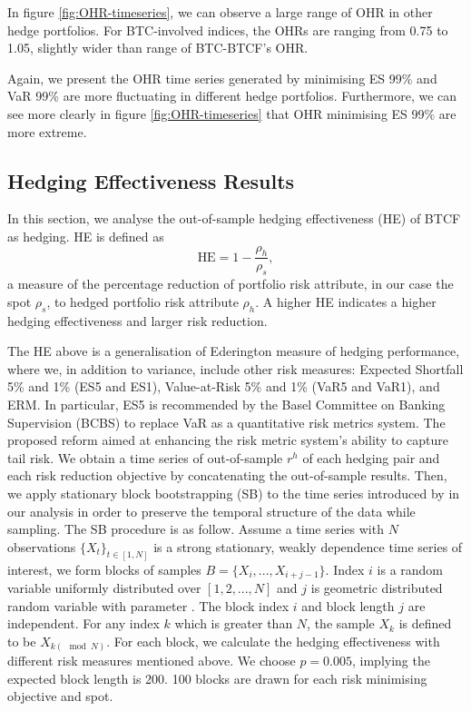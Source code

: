 In figure \ref{fig:OHR-timeseries}, we can observe a large range of OHR in other hedge portfolios.
For BTC-involved indices, the OHRs are ranging from 0.75 to 1.05, slightly wider than range of BTC-BTCF's OHR. \medskip

Again, we present the OHR time series generated by minimising ES 99\% and VaR 99\% are more fluctuating in different hedge portfolios.
Furthermore, we can see more clearly in figure \ref{fig:OHR-timeseries} that OHR minimising ES 99\% are more extreme. \medskip

\subsection{Hedging Effectiveness Results}\label{sec: HE results}
In this section, we analyse the out-of-sample hedging effectiveness (HE) of BTCF as hedging.
HE is defined as $$\text{HE} = 1-\frac{\rho_h}{\rho_s},$$
a measure of the percentage reduction of portfolio risk attribute, in our case the spot $\rho_s$,
to hedged portfolio risk attribute $\rho_h$.
A higher HE indicates a higher hedging effectiveness and larger risk reduction. \medskip

The HE above is a generalisation of Ederington measure of hedging performance, where we,
in addition to variance, include other risk measures: Expected Shortfall 5\% and 1\% (ES5 and ES1), Value-at-Risk 5\% and 1\% (VaR5 and VaR1), and ERM.
In particular, ES5 is recommended by the Basel Committee on Banking Supervision (BCBS) to replace VaR as a quantitative risk metrics system.
The proposed reform aimed at enhancing the risk metric system's ability to capture tail risk. \medskip
%
We obtain a time series of out-of-sample $r^h$ of each hedging pair and each risk reduction objective by concatenating the out-of-sample results.
Then, we apply stationary block bootstrapping (SB) to the time series introduced by \cite{Politis1994} in our analysis in order to preserve the temporal structure of the data while sampling.
The SB procedure is as follow.
Assume a time series with $N$ observations $\{X_t\}_{t \in [1,N]}$ is a strong stationary, weakly dependence time series of interest,
we form blocks of samples $B = \{X_i, ..., X_{i+j-1}\}$.
Index $i$ is a random variable uniformly distributed over $[1,2,...,N]$ and $j$ is geometric distributed random variable with parameter .
The block index $i$ and block length $j$ are independent.
For any index $k$ which is greater than $N$, the sample $X_k$ is defined to be $X_{k(\mod N)}$.
For each block, we calculate the hedging effectiveness with different risk measures mentioned above.
We choose $p=0.005$, implying the expected block length is 200.
100 blocks are drawn for each risk minimising objective and spot. \medskip

